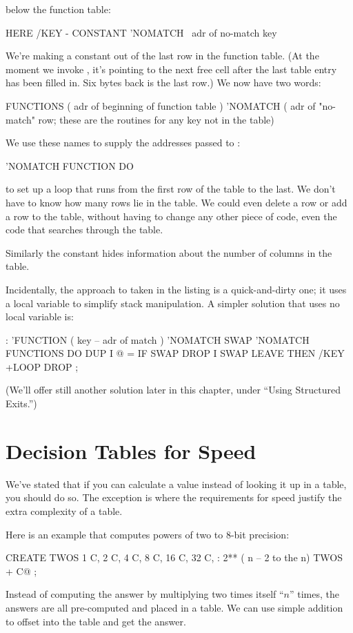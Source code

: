 below the function table:
\begin{Code}
HERE /KEY -  CONSTANT 'NOMATCH  \  adr of no-match key
\end{Code}
We're making a constant out of the last row in the function table. (At the
moment we invoke , it's pointing to the next free cell after
the last table entry has been filled in. Six bytes back is the last row.)
We now have two words:
\begin{Code}
FUNCTIONS  ( adr of beginning of function table )
'NOMATCH   ( adr of "no-match" row; these are the
             routines for any key not in the table)
\end{Code}
We use these names to supply the addresses passed to :
\begin{Code}
'NOMATCH FUNCTION DO
\end{Code}
to set up a loop that runs from the first row of the table to the last. We
don't have to know how many rows lie in the table. We could even delete a
row or add a row to the table, without having to change any other piece of
code, even the code that searches through the table.

Similarly the constant  hides information about the number of
columns in the table.

Incidentally, the approach to  taken in the listing is a
quick-and-dirty one; it uses a local variable to simplify stack
manipulation. A simpler solution that uses no local variable is:
\begin{Code}
: 'FUNCTION  ( key -- adr of match )
   'NOMATCH SWAP  'NOMATCH FUNCTIONS DO  DUP
      I @ =  IF SWAP DROP I SWAP  LEAVE  THEN
   /KEY +LOOP  DROP ;
\end{Code}
(We'll offer still another solution later in this chapter, under ``Using
Structured Exits.'')%
%

\section{Decision Tables for Speed}

We've stated that if you can calculate a value instead of looking it up in a
table, you should do so. The exception is where the requirements for
speed justify the extra complexity of a table.

Here is an example that computes powers of two to 8-bit precision:

\begin{Code}
CREATE TWOS
   1 C,  2 C,  4 C,  8 C,  16 C,  32 C,
: 2**  ( n -- 2 to the n)
   TWOS +  C@ ;
\end{Code}
Instead of computing the answer by multiplying two times itself ``$n$''
times, the answers are all pre-computed and placed in a table. We can use
simple addition to offset into the table and get the answer.

